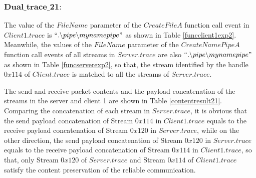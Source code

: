 \subsubsection{$\boldsymbol{Dual\_trace\_21:}$}
The value of the $FileName$ parameter of the $CreateFileA$ function call event in $Client1.trace$ is $``.\backslash pipe \backslash mynamepipe"$ as shown in Table \ref{funcclient1exp2}. Meanwhile, the values of the $FileName$ parameter of the $CreateNamePipeA$ function call events of all streams in $Server.trace$ are also $``.\backslash pipe \backslash mynamepipe"$ as shown in Table \ref{funcserverexp2}, so that, the stream identified by the handle $0x114$ of $Client.trace$ is matched to all the streams of $Server.trace$.

The send and receive packet contents and the payload concatenation of the streams in the server and client 1 are shown in Table \ref{contentresult21}. Comparing the concatenation of each stream in $Server.trace$, it is obvious that the send payload concatenation of Stream $0x114$ in $Client1.trace$ equals to the receive payload concatenation of Stream $0x120$ in $Server.trace$, while on the other direction, the send payload concatenation of Stream $0x120$ in $Server.trace$ equals to the receive payload concatenation of Stream $0x114$ in $Client1.trace$, so that, only Stream $0x120$ of $Server.trace$ and Stream $0x114$ of $Client1.trace$ satisfy the content preservation of the reliable communication. 

